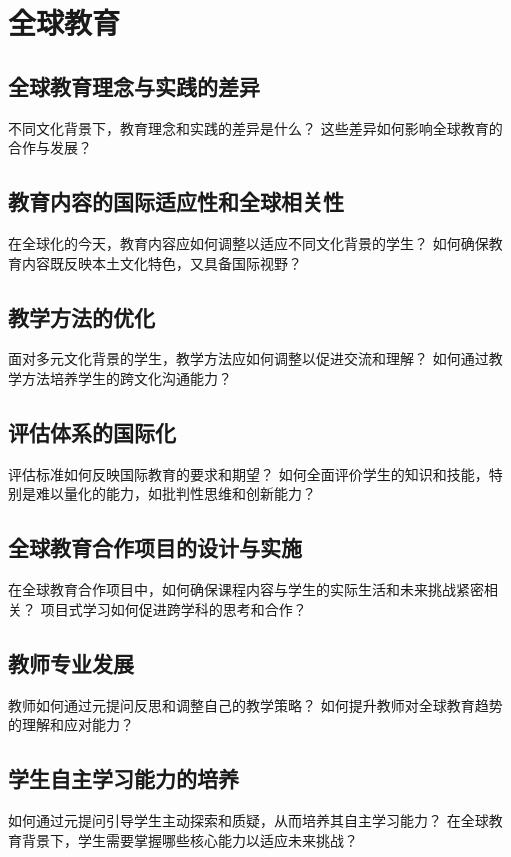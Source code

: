 \documentclass[12pt]{book}
\begin{document}
\section{全球教育}
\subsection{全球教育理念与实践的差异}

不同文化背景下，教育理念和实践的差异是什么？
这些差异如何影响全球教育的合作与发展？

\subsection{教育内容的国际适应性和全球相关性}
在全球化的今天，教育内容应如何调整以适应不同文化背景的学生？
如何确保教育内容既反映本土文化特色，又具备国际视野？

\subsection{教学方法的优化}
面对多元文化背景的学生，教学方法应如何调整以促进交流和理解？
如何通过教学方法培养学生的跨文化沟通能力？

\subsection{评估体系的国际化}
评估标准如何反映国际教育的要求和期望？
如何全面评价学生的知识和技能，特别是难以量化的能力，如批判性思维和创新能力？

\subsection{全球教育合作项目的设计与实施}
在全球教育合作项目中，如何确保课程内容与学生的实际生活和未来挑战紧密相关？
项目式学习如何促进跨学科的思考和合作？

\subsection{教师专业发展}
教师如何通过元提问反思和调整自己的教学策略？
如何提升教师对全球教育趋势的理解和应对能力？

\subsection{学生自主学习能力的培养}
如何通过元提问引导学生主动探索和质疑，从而培养其自主学习能力？
在全球教育背景下，学生需要掌握哪些核心能力以适应未来挑战？
\end{document}
